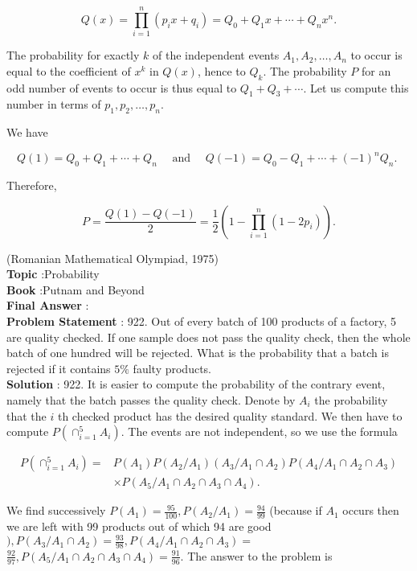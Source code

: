 \documentclass[10pt]{article}
\begin{document}
$$
Q(x)=\prod_{i=1}^{n}\left(p_{i} x+q_{i}\right)=Q_{0}+Q_{1} x+\cdots+Q_{n} x^{n} .
$$

The probability for exactly $k$ of the independent events $A_{1}, A_{2}, \ldots, A_{n}$ to occur is equal to the coefficient of $x^{k}$ in $Q(x)$, hence to $Q_{k}$. The probability $P$ for an odd number of events to occur is thus equal to $Q_{1}+Q_{3}+\cdots$. Let us compute this number in terms of $p_{1}, p_{2}, \ldots, p_{n}$.

We have

$$
Q(1)=Q_{0}+Q_{1}+\cdots+Q_{n} \quad \text { and } \quad Q(-1)=Q_{0}-Q_{1}+\cdots+(-1)^{n} Q_{n} \text {. }
$$

Therefore,

$$
P=\frac{Q(1)-Q(-1)}{2}=\frac{1}{2}\left(1-\prod_{i=1}^{n}\left(1-2 p_{i}\right)\right) .
$$

(Romanian Mathematical Olympiad, 1975)
\\
\textbf{Topic} :Probability\\
\textbf{Book} :Putnam and Beyond\\
\textbf{Final Answer} :\\


\textbf{Problem Statement} :
922. Out of every batch of 100 products of a factory, 5 are quality checked. If one sample does not pass the quality check, then the whole batch of one hundred will be rejected. What is the probability that a batch is rejected if it contains $5 \%$ faulty products.
\\
\textbf{Solution} :
922. It is easier to compute the probability of the contrary event, namely that the batch passes the quality check. Denote by $A_{i}$ the probability that the $i$ th checked product has the desired quality standard. We then have to compute $P\left(\cap_{i=1}^{5} A_{i}\right)$. The events are not independent, so we use the formula

$$
\begin{aligned}
P\left(\cap_{i=1}^{5} A_{i}\right)=& P\left(A_{1}\right) P\left(A_{2} / A_{1}\right)\left(A_{3} / A_{1} \cap A_{2}\right) P\left(A_{4} / A_{1} \cap A_{2} \cap A_{3}\right) \\
& \times P\left(A_{5} / A_{1} \cap A_{2} \cap A_{3} \cap A_{4}\right) .
\end{aligned}
$$

We find successively $P\left(A_{1}\right)=\frac{95}{100}, P\left(A_{2} / A_{1}\right)=\frac{94}{99}$ (because if $A_{1}$ occurs then we are left with 99 products out of which 94 are good $), P\left(A_{3} / A_{1} \cap A_{2}\right)=\frac{93}{98}, P\left(A_{4} / A_{1} \cap A_{2} \cap A_{3}\right)=$ $\frac{92}{97}, P\left(A_{5} / A_{1} \cap A_{2} \cap A_{3} \cap A_{4}\right)=\frac{91}{96}$. The answer to the problem is 
\end{document}

